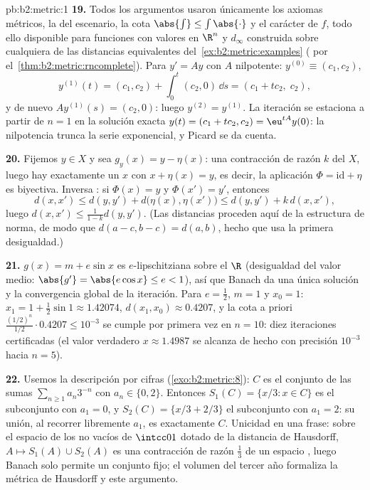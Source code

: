 \begin{solution}{pb:b2:metric:1}
\textbf{19.} Todos los argumentos usaron únicamente los axiomas
métricos, la  del escenario, la cota $\abs{\int} \leq
\int\abs{\cdot}$ y el carácter  de $f$, todo ello
disponible para funciones con valores en $\R^n$ y $d_\infty$
construida sobre cualquiera de las distancias equivalentes del~\cref{ex:b2:metric:examples} ( por el~\cref{thm:b2:metric:rncomplete}). Para $y' = Ay$ con $A$
nilpotente: $y^{(0)} \equiv (c_1, c_2)$,
\[
y^{(1)}(t) = (c_1, c_2) + \int_0^t (c_2, 0)\,\dd s
= (c_1 + tc_2,\; c_2),
\]
y de nuevo $Ay^{(1)}(s) = (c_2, 0)$: luego $y^{(2)} = y^{(1)}$. La
iteración se estaciona a partir de $n = 1$ en la solución exacta
$y(t) = (c_1 + tc_2, c_2) = \eu^{tA}y(0)$: la nilpotencia trunca
la serie exponencial, y Picard se da cuenta.

\textbf{20.} Fijemos $y \in X$ y sea $g_y(x) = y - \eta(x)$: una
contracción de razón $k$ del  $X$, luego hay exactamente
un $x$ con $x + \eta(x) = y$, es decir, la aplicación $\Phi =
\mathrm{id} + \eta$ es biyectiva. Inversa : si
$\Phi(x) = y$ y $\Phi(x') = y'$, entonces
\[
d(x, x') \leq d(y, y') + d\bigl(\eta(x), \eta(x')\bigr)
\leq d(y, y') + k\,d(x, x'),
\]
luego $d(x, x') \leq \frac{1}{1-k}d(y, y')$. (Las distancias
proceden aquí de la estructura de norma, de modo que $d(a - c, b -
c) = d(a, b)$, hecho que usa la primera desigualdad.)

\textbf{21.} $g(x) = m + e\sin x$ es $e$-lipschitziana sobre el
 $\R$ (desigualdad del valor medio: $\abs{g'} =
\abs{e\cos x} \leq e < 1$), así que Banach da una única solución y
la convergencia global de la iteración. Para $e = \frac12$, $m =
1$ y $x_0 = 1$: $x_1 = 1 + \frac12\sin 1 \approx 1.42074$, $d(x_1,
x_0) \approx 0.4207$, y la cota a priori
$\frac{(1/2)^n}{1/2}\cdot 0.4207 \leq 10^{-3}$ se cumple por
primera vez en $n = 10$: diez iteraciones certificadas (el valor
verdadero $x \approx 1.4987$ se alcanza de hecho con precisión
$10^{-3}$ hacia $n = 5$).

\textbf{22.} Usemos la descripción por cifras
(\cref{exo:b2:metric:8}): $C$ es el conjunto de las sumas
$\sum_{n\geq1}a_n3^{-n}$ con $a_n \in \{0, 2\}$. Entonces $S_1(C)
= \{x/3 : x \in C\}$ es el subconjunto con $a_1 = 0$, y $S_2(C) =
\{x/3 + 2/3\}$ el subconjunto con $a_1 = 2$: su unión, al recorrer
libremente $a_1$, es exactamente $C$. Unicidad en una frase: sobre
el espacio de los  no vacíos de $\intcc01$ dotado de la
distancia de Hausdorff, $A \mapsto S_1(A) \cup S_2(A)$ es una
contracción de razón $\frac13$ de un espacio , luego
Banach solo permite un conjunto fijo; el volumen del tercer año
formaliza la métrica de Hausdorff y este argumento.


\end{solution}
